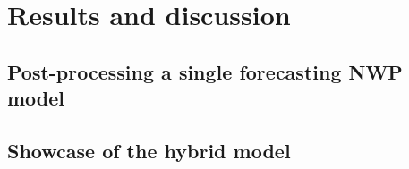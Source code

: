 \section{Results and discussion}
\subsection{Post-processing a single forecasting NWP model}
\subsection{Showcase of the hybrid model}